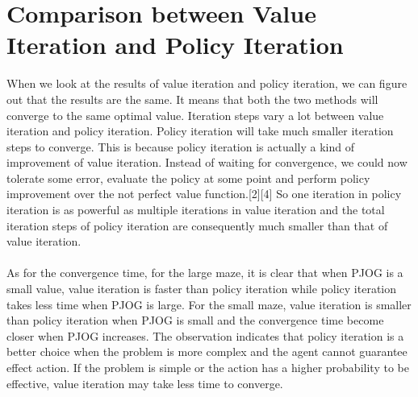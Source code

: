 \documentclass[11pt]{article}
\begin{document}
\section{Comparison between Value Iteration and Policy Iteration}
When we look at the results of value iteration and policy iteration, we can figure out that the results are the same. It means that both the two methods will converge to the same optimal value. Iteration steps vary a lot between value iteration and policy iteration. Policy iteration will take much smaller iteration steps to converge. This is because policy iteration is actually a kind of improvement of value iteration. Instead of waiting for convergence, we could now tolerate some error, evaluate the policy at some point and perform policy improvement over the not perfect value function.[2][4] So one iteration in policy iteration is as powerful as multiple iterations in value iteration and the total iteration steps of policy iteration are consequently much smaller than that of value iteration.\\
\\
As for the convergence time, for the large maze, it is clear that when PJOG is a small value, value iteration is faster than policy iteration while policy iteration takes less time when PJOG is large. For the small maze, value iteration is smaller than policy iteration when PJOG is small and the convergence time become closer when PJOG increases. The observation indicates that policy iteration is a better choice when the problem is more complex and the agent cannot guarantee effect action. If the problem is simple or the action has a higher probability to be effective, value iteration may take less time to converge.
\end{document}
